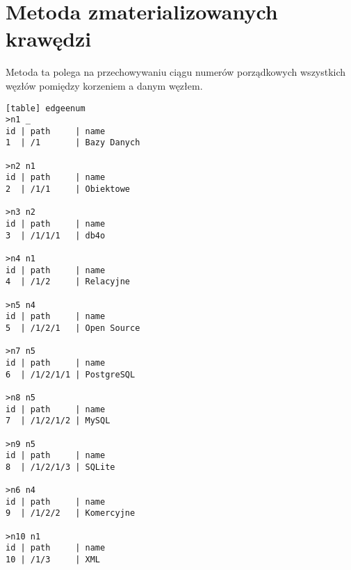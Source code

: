 \section{Metoda zmaterializowanych krawędzi}

Metoda ta polega na przechowywaniu ciągu numerów porządkowych wszystkich węzłów pomiędzy korzeniem a danym węzłem.



\begin{verbatim}[table] edgeenum
>n1 _
id | path     | name
1  | /1       | Bazy Danych

>n2 n1
id | path     | name
2  | /1/1     | Obiektowe

>n3 n2
id | path     | name
3  | /1/1/1   | db4o

>n4 n1
id | path     | name
4  | /1/2     | Relacyjne

>n5 n4
id | path     | name
5  | /1/2/1   | Open Source

>n7 n5
id | path     | name
6  | /1/2/1/1 | PostgreSQL

>n8 n5
id | path     | name
7  | /1/2/1/2 | MySQL

>n9 n5
id | path     | name
8  | /1/2/1/3 | SQLite

>n6 n4
id | path     | name
9  | /1/2/2   | Komercyjne

>n10 n1
id | path     | name
10 | /1/3     | XML

\end{verbatim}










